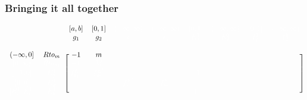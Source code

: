 \documentclass{beamer}
\def\w{\color{white}}
\begin{document}
\begin{frame}[shrink=25]
\frametitle{Bringing it all together}

    \begin{equation*}
        \begin{blockarray}{cccccccccc}
                               &                   & [a,b]             &
            [0,1]              &\w(-\infty,\infty) &\w(-\infty,\infty) &
            \w[0,1]            &\w(-\infty,\infty) & \w[0,1]           &
            \w(-\infty,\infty) \\ 
                               &                   & g_{1}             &
            g_{2}              & \w s_{1}          & \w s_{2}          &
            \w E_{f}^{1}       & \w E_{d}^{1}      & \w I_{f}^{1}      &
            \w I_{d}^{1}       \\
                               &                   &                   &
                               &                   &                   &
                               &                   &                   &
             \\ 
            \begin{block}{cc[cccccccc]}
            {(-\infty,0]}      &    Rto_{m}        &    -1             &
            m                  &                   &                   &
                               &                   &                   &
             \\
            \w {[0,\infty)}    & \w Rto_{M}        & \w -1             &
            \w M               &                   &                   &
                               &                   &                   &
             \\
            \w {[-1,0]}        & \w E_{f}^{1}      &\w f_{g_{1}}^{E^{1}}&
            \w f_{g_{2}}^{E^{1}}&                   &                   &
            \w -1              &                   &                   &
             \\
            \w {[0,0]}         & \w E_{d}^{1}      &                   &
                               &\w f_{s_{1}}^{E^{1}}& \w f_{s_{2}}^{E^{1}}&
                               & \w -1             &                   &
             \\
            \w {[E_{c}^{1},E_{c}^{1}]} 
                               & \w E_{b}^{1}      &                   &
                               &                   &                   &
            \w 1               & \w -1             &                   &
             \\

\end{block}
\end{blockarray}
\end{equation*}
\end{frame}
\end{document}
